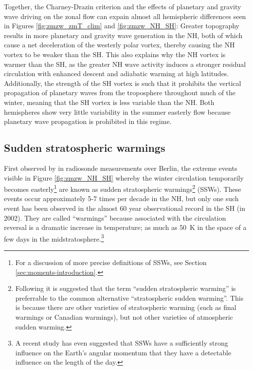 \bigskip Together, the Charney-Drazin criterion and the effects of planetary and
gravity wave driving on the zonal flow can expain almost all hemispheric
differences seen in Figures \ref{fig:zmzw_zmT_clim} and \ref{fig:zmzw_NH_SH}:
Greater topography results in more planetary and gravity wave generation in the
NH, both of which cause a net deceleration of the westerly polar vortex, thereby
causing the NH vortex to be weaker than the SH. This also explains why the NH
vortex is warmer than the SH, as the greater NH wave activity induces a stronger
residual circulation with enhanced descent and adiabatic warming at high
latitudes. Additionally, the strength of the SH vortex is such that it prohibits
the vertical propagation of planetary waves from the troposphere throughout much
of the winter, meaning that the SH vortex is less variable than the NH. Both
hemispheres show very little variability in the summer easterly flow because
planetary wave propagation is prohibited in this regime.


\subsection{Sudden stratospheric warmings}
\label{sec:strat-sudd-warm}
First observed by \citet{Scherhag1952} in radiosonde measurements over Berlin,
the extreme events visible in Figure \ref{fig:zmzw_NH_SH} whereby the winter
circulation temporarily becomes easterly\footnote{For a discussion of more
  precise definitions of SSWs, see Section \ref{sec:moments-introduction}.} are
known as sudden stratospheric warmings\footnote{Following \citet{Butler2014a} it
  is suggested that the term ``sudden stratospheric warming'' is preferrable to
  the common alternative ``stratospheric sudden warming''. This is because there
  are other varieties of stratospheric warming (such as final warmings or
  Canadian warmings), but not other varieties of atmospheric sudden warming.}
(SSWs). These events occur approximately 5-7 times per decade in the NH, but
only one such event has been observed in the almost 60 year observational record
in the SH (in 2002). They are called ``warmings'' because associated with the
circulation reversal is a dramatic increase in temperature; as much as 50~K in
the space of a few days in the midstratosphere.\footnote{A recent study
  \citep{??} has even suggested that SSWs have a sufficiently strong influence
  on the Earth's angular momentum that they have a detectable influence on the
  length of the day.}

